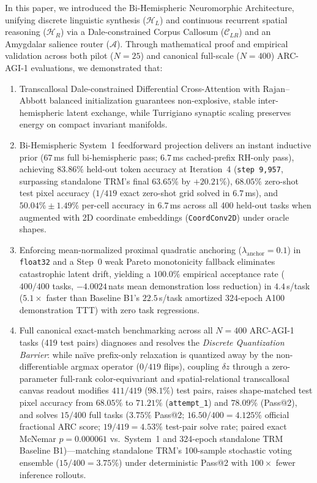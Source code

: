 \documentclass[11pt,a4paper]{article}
\theoremstyle{plain}
\theoremstyle{definition}
\theoremstyle{remark}
\newcommand{\HL}{\mathcal{H}_L}
\newcommand{\HR}{\mathcal{H}_R}
\newcommand{\CC}{\mathcal{C}_{LR}}
\newcommand{\AM}{\mathcal{A}}
\begin{document}
In this paper, we introduced the Bi-Hemispheric Neuromorphic Architecture, unifying discrete linguistic synthesis ($\HL$) and continuous recurrent spatial reasoning ($\HR$) via a Dale-constrained Corpus Callosum ($\CC$) and an Amygdalar salience router ($\AM$). Through mathematical proof and empirical validation across both pilot ($N = 25$) and canonical full-scale ($N = 400$) ARC-AGI-1 evaluations, we demonstrated that:
\begin{enumerate}
    \item Transcallosal Dale-constrained Differential Cross-Attention with Rajan--Abbott balanced initialization guarantees non-explosive, stable inter-hemispheric latent exchange, while Turrigiano synaptic scaling preserves energy on compact invariant manifolds.
    \item Bi-Hemispheric System~1 feedforward projection delivers an instant inductive prior ($67$\,ms full bi-hemispheric pass; $6.7$\,ms cached-prefix RH-only pass), achieving $83.86\%$ held-out token accuracy at Iteration~4 (\texttt{step 9,957}, surpassing standalone TRM's final $63.65\%$ by $+20.21\%$), $68.05\%$ zero-shot test pixel accuracy ($1 / 419$ exact zero-shot grid solved in $6.7$\,ms), and $50.04\% \pm 1.49\%$ per-cell accuracy in $6.7$\,ms across all 400 held-out tasks when augmented with 2D coordinate embeddings (\texttt{CoordConv2D}) under oracle shapes.
    \item Enforcing mean-normalized proximal quadratic anchoring ($\lambda_{\mathrm{anchor}} = 0.1$) in \texttt{float32} and a Step~0 weak Pareto monotonicity fallback eliminates catastrophic latent drift, yielding a $100.0\%$ empirical acceptance rate ($400 / 400$ tasks, $-4.0024$\,nats mean demonstration loss reduction) in $4.4$\,s/task ($5.1\times$ faster than Baseline B1's $22.5$\,s/task amortized 324-epoch A100 demonstration TTT) with zero task regressions.
    \item Full canonical exact-match benchmarking across all $N = 400$ ARC-AGI-1 tasks (419 test pairs) diagnoses and resolves the \emph{Discrete Quantization Barrier}: while na\"ive prefix-only relaxation is quantized away by the non-differentiable argmax operator ($0 / 419$ flips), coupling $\delta z$ through a zero-parameter full-rank color-equivariant and spatial-relational transcallosal canvas readout modifies $411 / 419$ ($98.1\%$) test pairs, raises shape-matched test pixel accuracy from $68.05\%$ to $71.21\%$ (\texttt{attempt\_1}) and $78.09\%$ (Pass@2), and solves $15 / 400$ full tasks ($3.75\%$ Pass@2; $16.50 / 400 = 4.125\%$ official fractional ARC score; $19 / 419 = 4.53\%$ test-pair solve rate; paired exact McNemar $p = 0.000061$ vs.\ System~1 and 324-epoch standalone TRM Baseline B1)---matching standalone TRM's 100-sample stochastic voting ensemble ($15 / 400 = 3.75\%$) under deterministic Pass@2 with $100\times$ fewer inference rollouts.
\end{enumerate}
\end{document}
